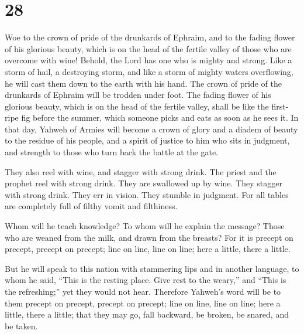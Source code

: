 \hypertarget{section-27}{%
\section{28}\label{section-27}}

 Woe to the crown of pride of the drunkards of Ephraim, and
to the fading flower of his glorious beauty, which is on the head of the
fertile valley of those who are overcome with wine!  Behold,
the Lord has one who is mighty and strong. Like a storm of hail, a
destroying storm, and like a storm of mighty waters overflowing, he will
cast them down to the earth with his hand.  The crown of
pride of the drunkards of Ephraim will be trodden under foot.
 The fading flower of his glorious beauty, which is on the
head of the fertile valley, shall be like the first-ripe fig before the
summer, which someone picks and eats as soon as he sees it. 
In that day, Yahweh of Armies will become a crown of glory and a diadem
of beauty to the residue of his people,  and a spirit of
justice to him who sits in judgment, and strength to those who turn back
the battle at the gate.

 They also reel with wine, and stagger with strong drink.
The priest and the prophet reel with strong drink. They are swallowed up
by wine. They stagger with strong drink. They err in vision. They
stumble in judgment.  For all tables are completely full of
filthy vomit and filthiness.

 Whom will he teach knowledge? To whom will he explain the
message? Those who are weaned from the milk, and drawn from the breasts?
 For it is precept on precept, precept on precept; line on
line, line on line; here a little, there a little.

 But he will speak to this nation with stammering lips and
in another language,  to whom he said, ``This is the
resting place. Give rest to the weary,'' and ``This is the refreshing;''
yet they would not hear.  Therefore Yahweh's word will be
to them precept on precept, precept on precept; line on line, line on
line; here a little, there a little; that they may go, fall backward, be
broken, be snared, and be taken.

